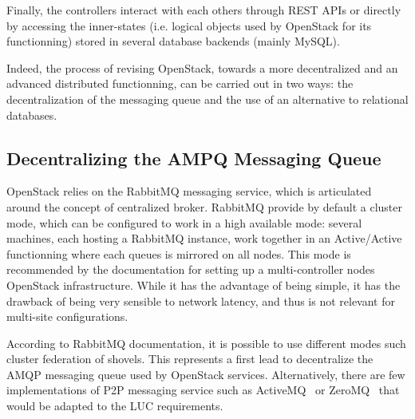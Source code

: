 Finally, the controllers interact with each others through REST APIs or directly
by accessing the inner-states (i.e. logical objects used by OpenStack for its
functionning) stored in several database backends (mainly MySQL).

Indeed, the process of revising OpenStack, towards a more decentralized and an
advanced distributed functionning, can be carried out in two ways: the
decentralization of the messaging queue and the use of an alternative to
relational databases.

\subsection{Decentralizing the AMPQ Messaging Queue}

OpenStack relies on the RabbitMQ messaging service, which is articulated around
the concept of centralized broker. RabbitMQ provide by default a cluster mode, 
which can be configured to work in a high available mode: several machines,
each hosting a RabbitMQ instance, work together in an Active/Active functionning
where each queues is mirrored on all nodes. This mode is recommended by the
documentation for setting up a multi-controller nodes OpenStack infrastructure.
While it has the advantage of being simple, it has the drawback of being very
sensible to network latency, and thus is not relevant for multi-site
configurations.

According to RabbitMQ documentation, it is possible to use different modes such
cluster federation of shovels. This represents a first lead to decentralize the
AMQP messaging queue used by OpenStack services. Alternatively, there are few
implementations of P2P messaging service such as ActiveMQ~\cite{activemq:2011}
or ZeroMQ~\cite{zeromq:2013} that would be adapted to the LUC requirements.

%
%
%
%


